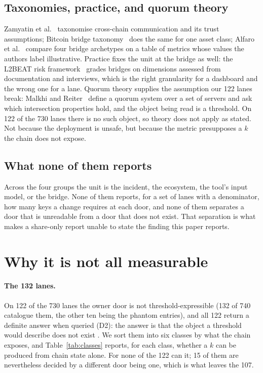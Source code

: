 \documentclass[10pt,a4paper]{article}
\newcommand{\code}[1]{\texttt{\detokenize{#1}}}
\begin{document}
\subsection{Taxonomies, practice, and quorum theory}
Zamyatin et al.~\cite{zamyatin2021sok} taxonomise cross-chain communication and its trust assumptions;
Bitcoin bridge taxonomy~\cite{bitcointaxonomy2025} does the same for one asset class; Alfaro et
al.~\cite{alfaro2025comparative} compare four bridge archetypes on a table of metrics whose values the
authors label illustrative. Practice fixes the unit at the bridge as well: the L2BEAT risk
framework~\cite{l2beat2024risk} grades bridges on dimensions assessed from documentation and interviews,
which is the right granularity for a dashboard and the wrong one for a lane. Quorum theory supplies the
assumption our 122 lanes break: Malkhi and Reiter~\cite{malkhi1998quorum} define a quorum system over a set
of servers and ask which intersection properties hold, and the object being read is a threshold. On 122 of
the 730 lanes there is no such object, so theory does not apply as stated. Not because the deployment
is unsafe, but because the metric presupposes a $k$ the chain does not expose.

\subsection{What none of them reports}
Across the four groups the unit is the incident, the ecosystem, the tool's input model, or the bridge.
None of them reports, for a set of lanes with a denominator, how many keys a change requires at each door,
and none of them separates a door that is unreadable from a door that does not exist. That separation is
what makes a share-only report unable to state the finding this paper reports.

\section{Why it is not all measurable}
\label{sec:notmeasurable}

\paragraph{The 132 lanes.}
On 122 of the 730 lanes the owner door is not threshold-expressible (132 of 740 catalogue them, the other ten being the phantom entries), and all 122 return a definite answer when
queried (D2): the answer is that the object a threshold would describe does not exist \code{[RESULTS:R5]}.
We sort them into six classes by what the chain exposes, and Table~\ref{tab:classes} reports, for each
class, whether a $k$ can be produced from chain state alone. For none of the 122 can it; 15 of them are nevertheless decided by a different door being one, which is what leaves the 107.
\end{document}
